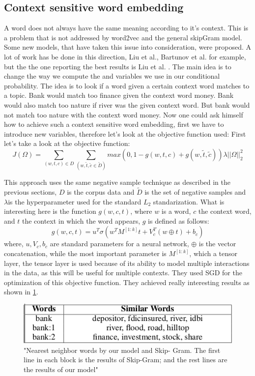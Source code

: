 \subsection{Context sensitive word embedding}
A word does not always have the same meaning according to it's context. This is a problem that is not addressed by word2vec and the general skipGram model. Some new models, that have taken this issue into consideration, were proposed. A lot of work has be done in this direction, Liu et al.\cite{topicalWE},  Bartunov et al.\cite{breaking} for example, but the the one reporting the best results is Liu et al. \cite{contextWithTensor}. The main idea is to change the way we compute the and variables we use in our conditional probability. The idea is to look if a word given a certain context word matches to a topic. Bank would match too finance given the context word money. Bank would also match too nature if river was the given context word. But bank would not match too nature with the context word money. Now one could ask himself how to achieve such a context sensitive word embedding, first we have to introduce new variables, therefore let's look at the objective function used: 
First let's take a look at the objective function:
\begin{equation}
J(\Omega) = \sum_{(w,t,c)\in D} \sum_{(w,\tilde{t},\tilde{c} \in{\tilde{D}})} max(0,1- g(w,t,c) + g(w,\tilde{t},\tilde{c})) \lambda||\Omega||_{2}^2
\end{equation}

This approach uses the same negative sample technique as described in the previous sections, $D$ is the corpus data and $\tilde{D}$ is the set of negative samples and $\lambda$is the hyperparameter used for the standard $L_2$ standarization. What is interesting here is the function $g(w,c,t)$, where $w$ is a word, $c$ the context word, and $t$ the context in which the word appears, $g$ is defined as follows: 
\begin{equation}
g(w,c,t) = u^T \sigma(w^TM^{[1:k]}t+V_c^T(w \oplus t) + b_c)
\end{equation}
where, $u, V_c, b_c$ are standard parameters for a neural network, $\oplus$ is the vector concatenation, while the most important parameter is $M^{[1:k]}$, which a tensor layer, the tensor layer is used because of its ability to model multiple interactions in the data, as this will be useful for multiple contexts. They used SGD for the optimization of this objective function.  They achieved really interesting results as shown in \ref{fig:multipleContext}.
\begin{figure}[ht]
    \centering
			\includegraphics[scale=0.7]{images/multipleContext.png} 
    \caption{"Nearest  neighbor  words  by  our  model  and  Skip-
Gram. The first line in each block is the results of Skip-Gram;
and the rest lines are the results of our model" \cite{contextWithTensor}}
    \label{fig:multipleContext}
\end{figure}

